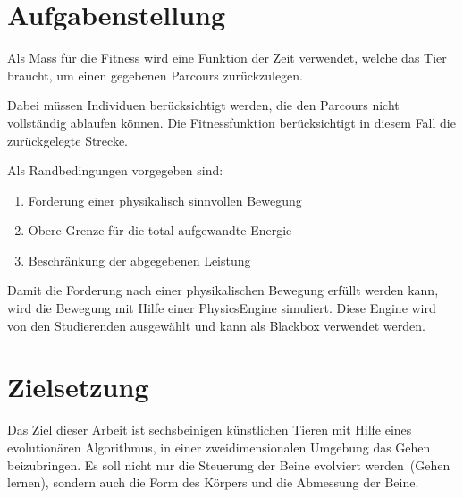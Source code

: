 
  \section{Aufgabenstellung}


    Als Mass für die Fitness wird eine Funktion der Zeit verwendet, welche das Tier braucht,
    um einen gegebenen Parcours zurückzulegen.


    Dabei müssen Individuen berücksichtigt werden, die den Parcours nicht vollständig ablaufen können.
    Die Fitnessfunktion berücksichtigt in diesem Fall die zurückgelegte Strecke.

    Als Randbedingungen vorgegeben sind:
    \begin{enumerate}
      \item Forderung einer physikalisch sinnvollen Bewegung
      \item Obere Grenze für die total aufgewandte Energie
      \item Beschränkung der abgegebenen Leistung
    \end{enumerate}
    Damit die Forderung nach einer physikalischen Bewegung erfüllt werden kann,
    wird die Bewegung mit Hilfe einer \gls{PhysicsEngine} simuliert.
    Diese Engine wird von den Studierenden ausgewählt und kann als Blackbox verwendet werden.

  \section{Zielsetzung}




    Das Ziel dieser Arbeit ist sechsbeinigen künstlichen Tieren mit Hilfe eines evolutionären Algorithmus,
    in einer zweidimensionalen Umgebung das Gehen beizubringen.
    Es soll nicht nur die Steuerung der Beine evolviert werden~(Gehen lernen),
    sondern auch die Form des Körpers und die Abmessung der Beine. \\

